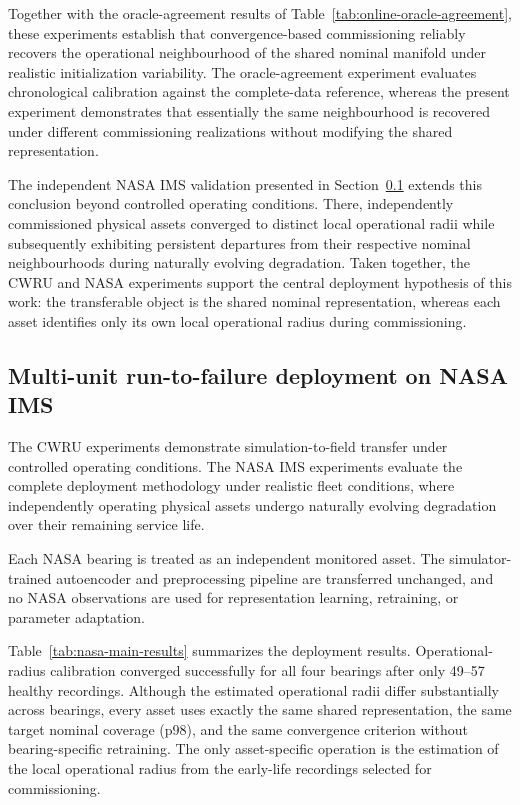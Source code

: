 \documentclass[numbered]{trbunofficial}
\begin{document}
Together with the oracle-agreement results of
Table~\ref{tab:online-oracle-agreement}, these experiments establish that
convergence-based commissioning reliably recovers the operational
neighbourhood of the shared nominal manifold under realistic initialization
variability. The oracle-agreement experiment evaluates chronological
calibration against the complete-data reference, whereas the present
experiment demonstrates that essentially the same neighbourhood is recovered
under different commissioning realizations without modifying the shared
representation.

The independent NASA IMS validation presented in
Section~\ref{sec:nasa-results} extends this conclusion beyond controlled
operating conditions. There, independently commissioned physical assets
converged to distinct local operational radii while subsequently exhibiting
persistent departures from their respective nominal neighbourhoods during
naturally evolving degradation. Taken together, the CWRU and NASA
experiments support the central deployment hypothesis of this work: the
transferable object is the shared nominal representation, whereas each asset
identifies only its own local operational radius during commissioning.

\subsection{Multi-unit run-to-failure deployment on NASA IMS}
\label{sec:nasa-results}

The CWRU experiments demonstrate simulation-to-field transfer under controlled
operating conditions. The NASA IMS experiments evaluate the complete deployment
methodology under realistic fleet conditions, where independently operating
physical assets undergo naturally evolving degradation over their remaining
service life.

Each NASA bearing is treated as an independent monitored asset. The
simulator-trained autoencoder and preprocessing pipeline are transferred
unchanged, and no NASA observations are used for representation learning,
retraining, or parameter adaptation.

Table~\ref{tab:nasa-main-results} summarizes the deployment results.
Operational-radius calibration converged successfully for all four bearings
after only 49--57 healthy recordings. Although the estimated operational
radii differ substantially across bearings, every asset uses exactly the same
shared representation, the same target nominal coverage (p98), and the same
convergence criterion without bearing-specific retraining.
The only asset-specific operation is the estimation of the local operational
radius from the early-life recordings selected for commissioning.
\end{document}
